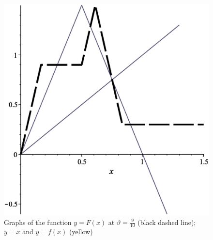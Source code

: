 \documentclass[12pt,a4paper]{amsart}
\begin{document}
\begin{figure}[h!]
\centering
\includegraphics[scale=0.28]{Fig10}
\caption{Graphs of the function $y = F(x)$ at $\vartheta=\frac{9}{10}$ (black dashed line); 
$y=x$ and $y=f(x)$ (yellow)} \label{f10}
\end{figure}
\end{document}
